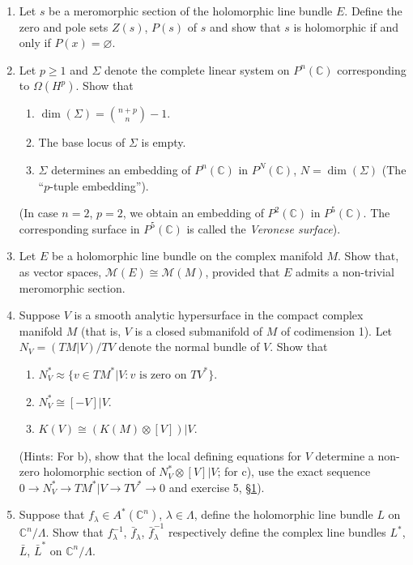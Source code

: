\begin{enumerate}
\item Let $s$ be a meromorphic section of the holomorphic line bundle $E$. Define the zero and pole sets $Z(s)$, $P(s)$ of $s$ and show that $s$ is holomorphic if and only if $P(x)=\varnothing$.
\item Let $p\geq1$ and $\Sigma$ denote the complete linear system on $P^n(\mathbb C)$ corresponding to $\Omega(H^p)$. Show that
\begin{enumerate}[label=\alph*)]
\item $\dim(\Sigma)=\binom{n+p}{n}-1$.
\item The base locus of $\Sigma$ is empty.
\item $\Sigma$ determines an embedding of $P^n(\mathbb C)$ in $P^N(\mathbb C)$, $N=\dim(\Sigma)$ (The ``$p$-tuple embedding'').
\end{enumerate}
(In case $n=2$, $p=2$, we obtain an embedding of $P^2(\mathbb C)$ in $P^5(\mathbb C)$. The corresponding surface in $P^5(\mathbb C)$ is called the \emph{Veronese surface}).
\item Let $E$ be a holomorphic line bundle on the complex manifold $M$. Show that, as vector spaces, $\mathcal M(E)\cong\mathcal M(M)$, provided that $E$ admits a non-trivial meromorphic section.
\item Suppose $V$ is a smooth analytic hypersurface in the compact complex manifold $M$ (that is, $V$ is a closed submanifold of $M$ of codimension 1). Let $N_V=(TM|V)/TV$ denote the normal bundle of $V$. Show that
\begin{enumerate}[label=\alph*)]
\item $N_V^*\approx\{v\in TM^*|V:v\text{ is zero on }TV^*\}$.
\item $N_V^*\cong[-V]|V$.
\item $K(V)\cong(K(M)\otimes[V])|V$.
\end{enumerate}
(Hints: For b), show that the local defining equations for $V$ determine a non-zero holomorphic section of $N_V^*\otimes[V]|V$; for c), use the exact sequence $0\to N_V^*\to TM^*|V\to TV^*\to0$ and exercise 5, \hyperref[sec:5:1]{\S1}).
\item Suppose that $f_\lambda\in A^*(\mathbb C^n)$, $\lambda\in\Lambda$, define the holomorphic line bundle $L$ on $\mathbb C^n/\Lambda$. Show that $f_\lambda^{-1}$, $\bar f_\lambda$, $\bar f_\lambda^{-1}$ respectively define the complex line bundles $L^*$, $\bar L$, $\bar L^*$ on $\mathbb C^n/\Lambda$.

\end{enumerate}
